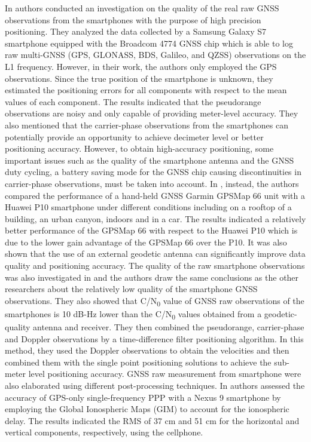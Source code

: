 In \cite{banville2016} authors conducted an investigation on the quality of the real raw GNSS observations from the smartphones with the purpose of high precision positioning. They analyzed the data collected by a Samsung Galaxy S7 smartphone equipped with the Broadcom 4774 GNSS chip which is able to log raw multi-GNSS (GPS, GLONASS, BDS, Galileo, and QZSS) observations on the L1 frequency. However, in their work, the authors only employed the GPS observations. Since the true position of the smartphone is unknown, they estimated the positioning errors for all components with respect to the mean values of each component. The results indicated that the pseudorange
observations are noisy and only capable of providing meter-level accuracy. They also mentioned that the carrier-phase observations from the smartphones can potentially provide an opportunity to achieve decimeter level or better positioning accuracy. However, to obtain high-accuracy positioning, some important issues such as the quality of the smartphone antenna and the GNSS
duty cycling, a battery saving mode for the GNSS chip causing discontinuities in carrier-phase observations, must be taken into account.
In \cite{Lachapelle2018}, instead, the authors compared the performance of a hand-held GNSS Garmin GPSMap 66 unit with a Huawei P10 smartphone under different conditions including on a rooftop of a building, an urban canyon, indoors and in a car. The results indicated a relatively better performance of the GPSMap 66 with respect to the Huawei P10 which is due to the lower gain advantage of the GPSMap 66 over the P10. It was also shown that the use of an external geodetic antenna can significantly improve data quality and positioning accuracy.
The quality of the raw smartphone observations was also investigated in \cite{Zhang:2018} and the authors draw the same conclusions as the other researchers about the relatively low quality of the smartphone GNSS observations. They also showed that C/N\textsubscript{0} value of GNSS raw observations of the smartphones is 10 dB-Hz lower than the C/N\textsubscript{0} values obtained from a geodetic-quality antenna and receiver. They then combined the pseudorange, carrier-phase and Doppler observations by a time-difference filter positioning algorithm. In this method, they used the Doppler observations to obtain the velocities and then combined them with the single point positioning solutions to achieve the sub-meter level positioning accuracy.
GNSS raw measurement from smartphone were also elaborated using different post-processing techniques. In \cite{Gill2018} authors assessed the accuracy of GPS-only single-frequency PPP with a Nexus 9 smartphone by employing the Global Ionospheric Maps (GIM) to account for the ionospheric delay. The results indicated the RMS of 37 cm and 51 cm for the horizontal and vertical components, respectively, using the cellphone. 
